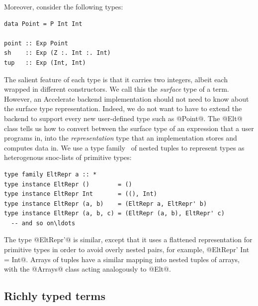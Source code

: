 Moreover, consider the following types:
%
\begin{lstlisting}[style=haskell]
data Point = P Int Int

point :: Exp Point
sh    :: Exp (Z :. Int :. Int)
tup   :: Exp (Int, Int)
\end{lstlisting}
%
The salient feature of each type is that it carries two integers, albeit each
wrapped in different constructors. We call this the
\emph{surface} type of a term. However, an Accelerate
backend implementation should not need to know about the surface type
representation. Indeed, we do not want to have to extend the backend to support
every new user-defined type such as @Point@. The @Elt@ class tells us how to
convert between the surface type of an expression that a user programs in, into
the \emph{representation} type that an implementation
stores and computes data in. We use a type
family~\cite{Chakravarty:2005dx,Schrijvers:2008ir} of nested tuples to represent
types as heterogenous snoc-lists of primitive types:
%
\begin{lstlisting}[style=haskell]
type family EltRepr a :: *
type instance EltRepr ()        = ()
type instance EltRepr Int       = ((), Int)
type instance EltRepr (a, b)    = (EltRepr a, EltRepr' b)
type instance EltRepr (a, b, c) = (EltRepr (a, b), EltRepr' c)
  -- and so on\ldots
\end{lstlisting}
%
The type @EltRepr'@ is similar, except that it uses a flattened representation
for primitive types in order to avoid overly nested pairs, for example,
@EltRepr' Int = Int@. Arrays of tuples have a similar mapping into
nested tuples of arrays, with the @Arrays@ class acting analogously to @Elt@.


\subsection{Richly typed terms}
\label{sec:richly_typed_terms}

